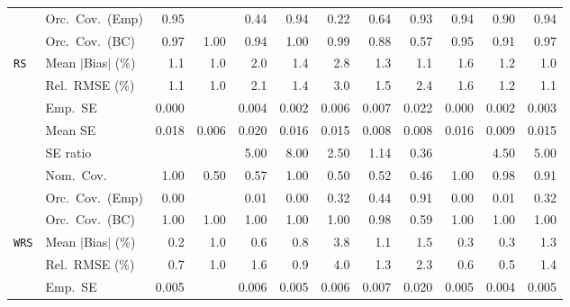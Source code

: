 \begin{landscape}
\begin{longtable}{llrrrrrrrrrr}
 & Orc.\ Cov.\ (Emp) & \cellcolor{rankone}0.95 &  & 0.44 & \cellcolor{ranktwo}0.94 & 0.22 & 0.64 & \cellcolor{rankthree}0.93 & \cellcolor{ranktwo}0.94 & 0.90 & \cellcolor{ranktwo}0.94 \\
 & Orc.\ Cov.\ (BC) & \cellcolor{rankthree}0.97 & 1.00 & \cellcolor{ranktwo}0.94 & 1.00 & 0.99 & 0.88 & 0.57 & \cellcolor{rankone}0.95 & 0.91 & \cellcolor{rankthree}0.97 \\
\addlinespace[2pt]
\quad \texttt{RS} & Mean $|$Bias$|$ (\%) & \cellcolor{ranktwo}1.1 & \cellcolor{rankone}1.0 & 2.0 & 1.4 & 2.8 & 1.3 & \cellcolor{ranktwo}1.1 & 1.6 & \cellcolor{rankthree}1.2 & \cellcolor{rankone}1.0 \\
 & Rel.\ RMSE (\%) & \cellcolor{ranktwo}1.1 & \cellcolor{rankone}1.0 & 2.1 & 1.4 & 3.0 & 1.5 & 2.4 & 1.6 & \cellcolor{rankthree}1.2 & \cellcolor{ranktwo}1.1 \\
 & Emp.\ SE & 0.000 &  & 0.004 & 0.002 & 0.006 & 0.007 & 0.022 & 0.000 & 0.002 & 0.003 \\
 & Mean SE & 0.018 & 0.006 & 0.020 & 0.016 & 0.015 & 0.008 & 0.008 & 0.016 & 0.009 & 0.015 \\
 & SE ratio &  &  & 5.00 & 8.00 & \cellcolor{rankthree}2.50 & \cellcolor{rankone}1.14 & \cellcolor{ranktwo}0.36 &  & 4.50 & 5.00 \\
 & Nom.\ Cov. & \cellcolor{rankthree}1.00 & 0.50 & 0.57 & \cellcolor{rankthree}1.00 & 0.50 & 0.52 & 0.46 & \cellcolor{rankthree}1.00 & \cellcolor{rankone}0.98 & \cellcolor{ranktwo}0.91 \\
 & Orc.\ Cov.\ (Emp) & 0.00 &  & 0.01 & 0.00 & \cellcolor{rankthree}0.32 & \cellcolor{ranktwo}0.44 & \cellcolor{rankone}0.91 & 0.00 & 0.01 & \cellcolor{rankthree}0.32 \\
 & Orc.\ Cov.\ (BC) & \cellcolor{ranktwo}1.00 & \cellcolor{ranktwo}1.00 & \cellcolor{ranktwo}1.00 & \cellcolor{ranktwo}1.00 & \cellcolor{ranktwo}1.00 & \cellcolor{rankone}0.98 & \cellcolor{rankthree}0.59 & \cellcolor{ranktwo}1.00 & \cellcolor{ranktwo}1.00 & \cellcolor{ranktwo}1.00 \\
\addlinespace[2pt]
\quad \texttt{WRS} & Mean $|$Bias$|$ (\%) & \cellcolor{rankone}0.2 & 1.0 & \cellcolor{rankthree}0.6 & 0.8 & 3.8 & 1.1 & 1.5 & \cellcolor{ranktwo}0.3 & \cellcolor{ranktwo}0.3 & 1.3 \\
 & Rel.\ RMSE (\%) & \cellcolor{rankthree}0.7 & 1.0 & 1.6 & 0.9 & 4.0 & 1.3 & 2.3 & \cellcolor{ranktwo}0.6 & \cellcolor{rankone}0.5 & 1.4 \\
 & Emp.\ SE & 0.005 &  & 0.006 & 0.005 & 0.006 & 0.007 & 0.020 & 0.005 & 0.004 & 0.005 \\

\end{longtable}
\end{landscape}
